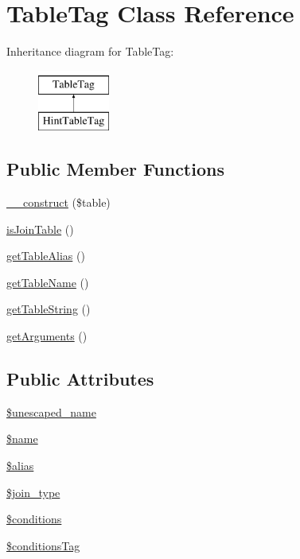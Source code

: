 \hypertarget{classTableTag}{\section{Table\-Tag Class Reference}
\label{classTableTag}
}
Inheritance diagram for Table\-Tag\-:\begin{figure}[H]
\begin{center}
\leavevmode
\includegraphics[height=2.000000cm]{classTableTag}
\end{center}
\end{figure}
\subsection*{Public Member Functions}
\begin{DoxyCompactItemize}
\item 
\hyperlink{classTableTag_a39d8515e6ac5a562e8e62bc77f891ce6}{\-\_\-\-\_\-construct} (\$table)
\item 
\hyperlink{classTableTag_ac27cd91a8df4854bc7598260a030bd7b}{is\-Join\-Table} ()
\item 
\hyperlink{classTableTag_a52a3da2a0eee31ce88e44e38e71dfa9a}{get\-Table\-Alias} ()
\item 
\hyperlink{classTableTag_aca16238dff09141c6de5590416c872fb}{get\-Table\-Name} ()
\item 
\hyperlink{classTableTag_a51d350dda88e10bd240831af89e10fd1}{get\-Table\-String} ()
\item 
\hyperlink{classTableTag_a39fa54b8c8be305fec72ce6b7e9920a3}{get\-Arguments} ()
\end{DoxyCompactItemize}
\subsection*{Public Attributes}
\begin{DoxyCompactItemize}
\item 
\hyperlink{classTableTag_aa7fe4c9dfe7ea60993ebaf0bd2f24e56}{\$unescaped\-\_\-name}
\item 
\hyperlink{classTableTag_adab1e27e976c86151cadf9dd315427c7}{\$name}
\item 
\hyperlink{classTableTag_a4c65f27c8fdf150de28ff081d7e214e8}{\$alias}
\item 
\hyperlink{classTableTag_ac78ab418306b73bfba9782dcea2b5436}{\$join\-\_\-type}
\item 
\hyperlink{classTableTag_a7d7a1d2b61dc48eb0ee9928c85259221}{\$conditions}
\item 
\hyperlink{classTableTag_adb5ca6b036a491af6be55e2253393ccc}{\$conditions\-Tag}
\end{DoxyCompactItemize}


